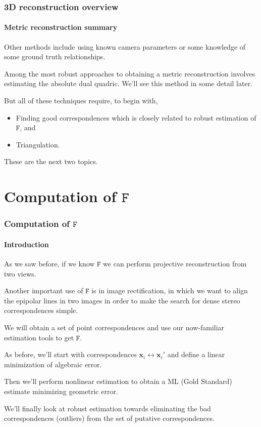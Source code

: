 \documentclass[aspectratio=169]{beamer}
\renewcommand{\vec}[1]{\boldsymbol{#1}}
\newcommand{\mat}[1]{\mathtt{#1}}
\begin{document}
\begin{frame}
\frametitle{3D reconstruction overview}
\framesubtitle{Metric reconstruction summary}

Other methods include using \alert{known camera parameters} or some
knowledge of some \alert{ground truth} relationships.

\medskip

Among the most robust approaches to obtaining a metric reconstruction
involves estimating the \alert{absolute dual quadric}.  We'll see this
method in some detail later.

\medskip

But all of these techniques require, to begin with,
\begin{itemize}
\item \alert{Finding good correspondences} which
is closely related to robust estimation of $\mat{F}$, and
\item \alert{Triangulation}.
\end{itemize}

These are the next two topics.

\end{frame}

\section{Computation of $\mat{F}$}

\begin{frame}
\frametitle{Computation of $\mat{F}$}
\framesubtitle{Introduction}

As we saw before, if we know $\mat{F}$ we can perform projective
reconstruction from two views.

\medskip

Another important use of $\mat{F}$ is in image \alert{rectification},
in which we want to align the epipolar lines in two images in order to
make the search for \alert{dense stereo correspondences} simple.

\medskip

We will obtain a set of \alert{point correspondences} and use our
now-familiar estimation tools to get $\mat{F}$.

\medskip

As before, we'll start with correspondences $\vec{x}_i \leftrightarrow
\vec{x}_i'$ and define a \alert{linear minimization} of
\alert{algebraic error}.

\medskip

Then we'll perform \alert{nonlinear estimation} to obtain a ML (Gold
Standard) estimate minimizing \alert{geometric error}.

\medskip

We'll finally look at \alert{robust estimation} towards eliminating
the bad correspondences (outliers) from the set of putative
correspondences.

\end{frame}
\end{document}
